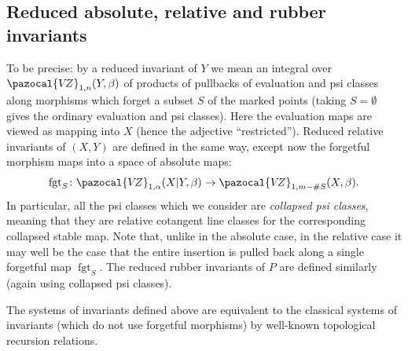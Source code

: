 \documentclass[11pt]{amsart}
\newcommand{\VZ}{\pazocal{V\!Z}}
\renewcommand{\to}{\rightarrow}
\newcommand{\fgt}{\operatorname{fgt}}
\theoremstyle{definition}
\theoremstyle{definition}
\begin{document}
\subsection{Reduced absolute, relative and rubber invariants} To be precise: by a reduced invariant of $Y$ we mean an integral over $\VZ_{1,n}(Y,\beta)$ of products of pullbacks of evaluation and psi classes along morphisms which forget a subset $S$ of the marked points (taking $S=\emptyset$ gives the ordinary evaluation and psi classes). Here the evaluation maps are viewed as mapping into $X$ (hence the adjective ``restricted''). Reduced relative invariants of $(X,Y)$ are defined in the same way, except now the forgetful morphism maps into a space of absolute maps:
\begin{equation*} \fgt_S \colon \VZ_{1,\alpha}(X|Y,\beta) \to \VZ_{1,m-\#S}(X,\beta).\end{equation*}
In particular, all the psi classes which we consider are \emph{collapsed psi classes}, meaning that they are relative cotangent line classes for the corresponding collapsed stable map. Note that, unlike in the absolute case, in the relative case it may well be the case that the entire insertion is pulled back along a single forgetful map $\fgt_S$. The reduced rubber invariants of $P$ are defined similarly (again using collapsed psi classes).

The systems of invariants defined above are equivalent to the classical systems of invariants (which do not use forgetful morphisms) by well-known topological recursion relations.
\end{document}
